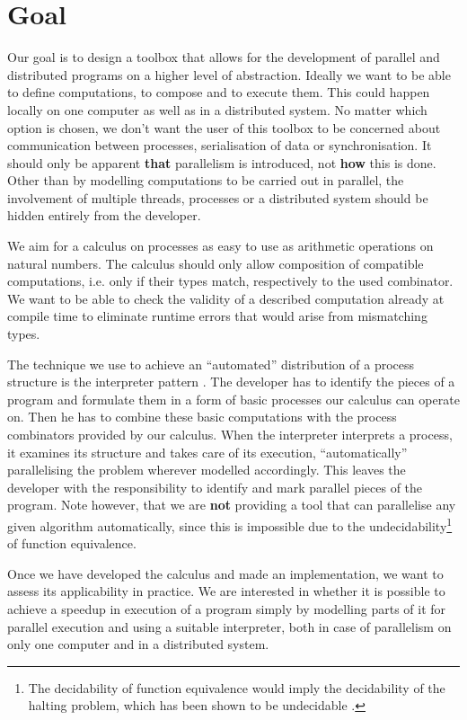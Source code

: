 \section{Goal}
\label{chp:goal}
Our goal is to design a toolbox that allows for the development of parallel and distributed programs on a higher level of abstraction. Ideally we want to be able to define computations, to compose and to execute them. This could happen locally on one computer as well as in a distributed system. No matter which option is chosen, we don't want the user of this toolbox to be concerned about communication between processes, serialisation of data or synchronisation. It should only be apparent \textbf{that} parallelism is introduced, not \textbf{how} this is done. Other than by modelling computations to be carried out in parallel, the involvement of multiple threads, processes or a distributed system should be hidden entirely from the developer.

We aim for a calculus on processes as easy to use as arithmetic operations on natural numbers. The calculus should only allow composition of compatible computations, i.e. only if their types match, respectively to the used combinator. We want to be able to check the validity of a described computation already at compile time to eliminate runtime errors that would arise from mismatching types.

The technique we use to achieve an \enquote{automated} distribution of a process structure is the interpreter pattern \cite{Gamma:1995:DPE:186897}. The developer has to identify the pieces of a program and formulate them in a form of basic processes our calculus can operate on. Then he has to combine these basic computations with the process combinators provided by our calculus. When the interpreter interprets a process, it examines its structure and takes care of its execution, \enquote{automatically} parallelising the problem wherever modelled accordingly. This leaves the developer with the responsibility to identify and mark parallel pieces of the program. Note however, that we are \textbf{not} providing a tool that can parallelise any given algorithm automatically, since this is impossible due to the undecidability\footnote{The decidability of function equivalence would imply the decidability of the halting problem, which has been shown to be undecidable \citep{Garey:1979:CIG:578533}.} of function equivalence.

Once we have developed the calculus and made an implementation, we want to assess its applicability in practice. We are interested in whether it is possible to achieve a speedup in execution of a program simply by modelling parts of it for parallel execution and using a suitable interpreter, both in case of parallelism on only one computer and in a distributed system.

